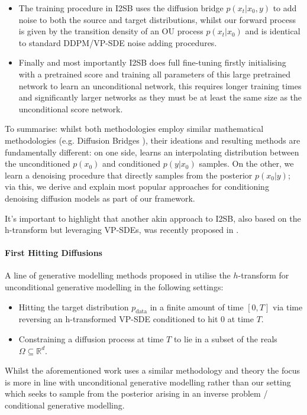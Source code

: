 {\begin{itemize}
    \item The training procedure in I2SB uses the diffusion bridge $p(x_t| x_0, y)$ to add noise to both the source and target distributions, whilst our forward process is given by the transition density of an OU process $p(x_t| x_0)$ and is identical to standard DDPM/VP-SDE \citep{ho2020denoising,song2020score} noise adding procedures.

    \item Finally and most importantly I2SB does full fine-tuning firstly initialising with a pretrained score and training all parameters of this large pretrained network to learn an unconditional network, this requires longer training times and significantly larger networks as they must be at least the same size as the unconditional score network. 
\end{itemize}

To summarise: whilst both methodologies employ similar mathematical methodologies (e.g. Diffusion Bridges \citep{de2021simulating}), their ideations and resulting methods are fundamentally different: on one side, \textcite{liu20232} learns an interpolating distribution between the unconditioned $p(x_0)$ and conditioned $p(y| x_0)$ samples. On the other, we learn a denoising procedure that directly samples from the posterior  $p( x_0 | y)$; via this, we derive and explain most popular approaches for conditioning denoising diffusion models as part of our framework.

It's important to highlight that another akin approach to I2SB, also based on the h-transform but leveraging VP-SDEs, was recently proposed in \citep{zhou2024denoising}.
}

\paragraph{First Hitting Diffusions}{
A line of generative modelling methods proposed in \citep{liu2023learning,ye2022first} utilise the $h$-transform for unconditional generative modelling in the following settings: 

\begin{itemize}
    \item Hitting the target distribution $p_{\mathrm{data}}$ in a finite amount of time $[0,T]$ via time reversing an h-transformed VP-SDE conditioned to hit $0$ at time $T$.
    \item Constraining a diffusion process at time $T$ to lie in a subset of the reals $\Omega \subseteq \mathbb{R}^d$. 
\end{itemize}

Whilst the aforementioned work uses a similar methodology and theory the focus is more in line with unconditional generative modelling rather than our setting which seeks to sample from the posterior arising in an inverse problem / conditional generative modelling.
}
